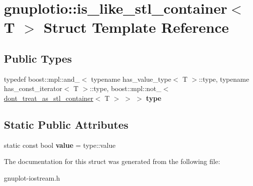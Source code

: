 \hypertarget{structgnuplotio_1_1is__like__stl__container}{}\section{gnuplotio\+:\+:is\+\_\+like\+\_\+stl\+\_\+container$<$ T $>$ Struct Template Reference}
\label{structgnuplotio_1_1is__like__stl__container}
\subsection*{Public Types}
\begin{DoxyCompactItemize}
\item 
\mbox{\label{structgnuplotio_1_1is__like__stl__container_a050ecfa55e896a27f86d901334f47c6a}} 
typedef boost\+::mpl\+::and\+\_\+$<$ typename has\+\_\+value\+\_\+type$<$ T $>$\+::type, typename has\+\_\+const\+\_\+iterator$<$ T $>$\+::type, boost\+::mpl\+::not\+\_\+$<$ \hyperlink{structgnuplotio_1_1dont__treat__as__stl__container}{dont\+\_\+treat\+\_\+as\+\_\+stl\+\_\+container}$<$ T $>$ $>$ $>$ {\bfseries type}
\end{DoxyCompactItemize}
\subsection*{Static Public Attributes}
\begin{DoxyCompactItemize}
\item 
\mbox{\label{structgnuplotio_1_1is__like__stl__container_ae4761e6e807deed732e41118c785c8a4}} 
static const bool {\bfseries value} = type\+::value
\end{DoxyCompactItemize}


The documentation for this struct was generated from the following file\+:\begin{DoxyCompactItemize}
\item 
gnuplot-\/iostream.\+h\end{DoxyCompactItemize}
